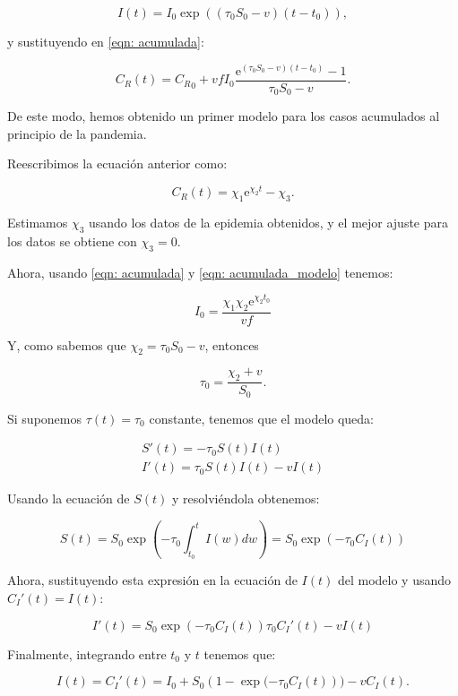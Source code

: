 $$I(t) = I_0\exp{((\tau_0 S_0-v)(t-t_0))},$$

y sustituyendo en \eqref{eqn: acumulada}:

$$C_R(t) = {C_R}_0 + vfI_0\frac{\mathrm{e}^{(\tau_0 S_0 -v)(t-t_0)} -1}{\tau_0 S_0-v}.$$

De este modo, hemos obtenido un primer modelo para los casos acumulados al principio de la pandemia.

Reescribimos la ecuación anterior como:

\begin{equation}
\label{eqn: acumulada_modelo}
C_R(t) = \chi_1 \mathrm{e}^{\chi_2 t} -\chi_3.
\end{equation}

Estimamos $\chi_3$ usando los datos de la epidemia obtenidos, y el mejor ajuste para los datos se obtiene con $\chi_3=0$.

Ahora, usando \eqref{eqn: acumulada} y \eqref{eqn: acumulada_modelo} tenemos:

\begin{equation}
I_0=\frac{\chi_1\chi_2\mathrm{e}^{\chi_2 t_0}}{vf}
\end{equation}

Y, como sabemos que $\chi_2 = \tau_0 S_0-v$, entonces

\begin{equation}
\tau_0 = \frac{\chi_2+v}{S_0}.
\end{equation}

Si suponemos $\tau (t) = \tau_0$ constante, tenemos que el modelo queda:

\begin{equation}
\begin{aligned}
S'(t) = -\tau_0S(t)I(t) \\
I'(t) = \tau_0S(t)I(t) -vI(t)
\end{aligned}
\end{equation}

Usando la ecuación de $S(t)$ y resolviéndola obtenemos:

$$S(t) = S_0\exp{\left( -\tau_0 \int_{t_0}^t I(w) dw \right)} = S_0\exp{(-\tau_0 C_I(t))}$$

Ahora, sustituyendo esta expresión en la ecuación de $I(t)$ del modelo y usando $C_I'(t)=I(t)$:

$$I'(t) = S_0\exp{\left( -\tau_0 C_I(t)\right) }\tau_0 C_I'(t)-vI(t)$$

Finalmente, integrando entre $t_0$ y $t$ tenemos que:

$$I(t)=C_I'(t)=I_0+S_0(1-\exp{(-\tau_0 C_I(t)}))-vC_I(t).$$
 
